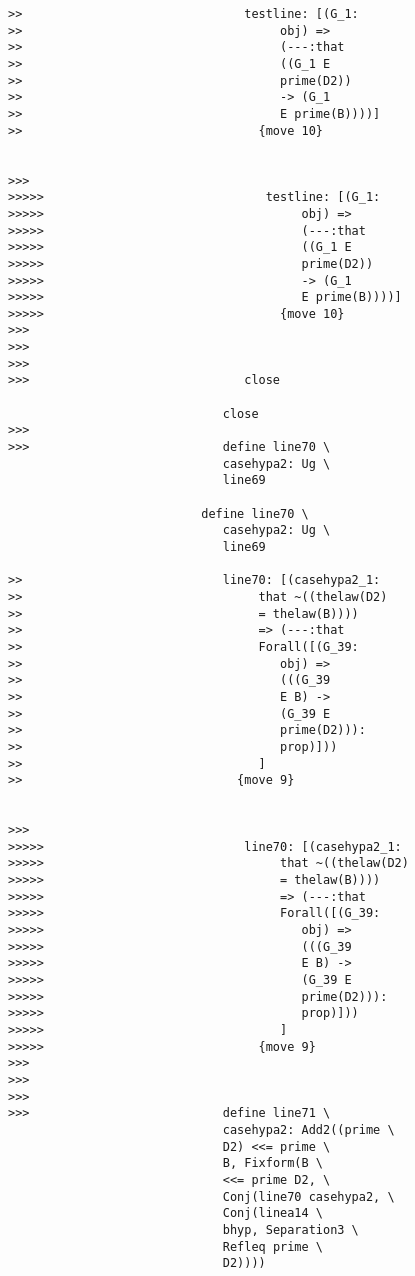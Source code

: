 \documentclass[12pt]{article}
\begin{document}
\begin{verbatim}
>>                               testline: [(G_1:
>>                                    obj) =>
>>                                    (---:that
>>                                    ((G_1 E
>>                                    prime(D2))
>>                                    -> (G_1
>>                                    E prime(B))))]
>>                                 {move 10}


>>>
>>>>>                               testline: [(G_1:
>>>>>                                    obj) =>
>>>>>                                    (---:that
>>>>>                                    ((G_1 E
>>>>>                                    prime(D2))
>>>>>                                    -> (G_1
>>>>>                                    E prime(B))))]
>>>>>                                 {move 10}
>>>
>>>
>>>
>>>                              close

                              close
>>>
>>>                           define line70 \
                              casehypa2: Ug \
                              line69

                           define line70 \
                              casehypa2: Ug \
                              line69

>>                            line70: [(casehypa2_1:
>>                                 that ~((thelaw(D2)
>>                                 = thelaw(B))))
>>                                 => (---:that
>>                                 Forall([(G_39:
>>                                    obj) =>
>>                                    (((G_39
>>                                    E B) ->
>>                                    (G_39 E
>>                                    prime(D2))):
>>                                    prop)]))
>>                                 ]
>>                              {move 9}


>>>
>>>>>                            line70: [(casehypa2_1:
>>>>>                                 that ~((thelaw(D2)
>>>>>                                 = thelaw(B))))
>>>>>                                 => (---:that
>>>>>                                 Forall([(G_39:
>>>>>                                    obj) =>
>>>>>                                    (((G_39
>>>>>                                    E B) ->
>>>>>                                    (G_39 E
>>>>>                                    prime(D2))):
>>>>>                                    prop)]))
>>>>>                                 ]
>>>>>                              {move 9}
>>>
>>>
>>>
>>>                           define line71 \
                              casehypa2: Add2((prime \
                              D2) <<= prime \
                              B, Fixform(B \
                              <<= prime D2, \
                              Conj(line70 casehypa2, \
                              Conj(linea14 \
                              bhyp, Separation3 \
                              Refleq prime \
                              D2))))


\end{verbatim}
\end{document}
